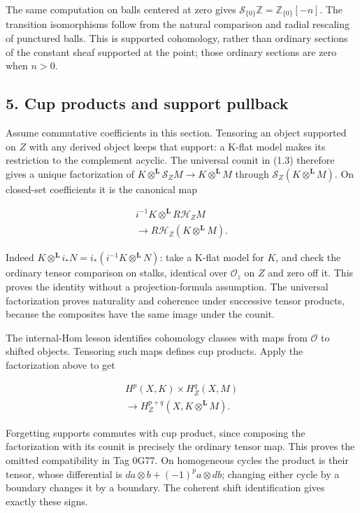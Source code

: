 \documentclass[
  english,
  11pt,
  a4paper,
]{article}
\begin{document}
The same computation on balls centered at zero gives
\(\mathcal S_{\{0\}}\mathbb Z=\mathbb Z_{\{0\}}[-n]\). The transition
isomorphisms follow from the natural comparison and radial rescaling of
punctured balls. This is supported cohomology, rather than ordinary
sections of the constant sheaf supported at the point; those ordinary
sections are zero when \(n>0\).

\subsection{5. Cup products and support
pullback}\label{sections-with-support-and-the-localization-triangle--5-cup-products-and-support-pullback}

Assume commutative coefficients in this section. Tensoring an object
supported on \(Z\) with any derived object keeps that support: a K-flat
model makes its restriction to the complement acyclic. The universal
counit in (1.3) therefore gives a unique factorization of
\(K\otimes^{\mathbf L}\mathcal S_ZM\to K\otimes^{\mathbf L}M\) through
\(\mathcal S_Z(K\otimes^{\mathbf L}M)\). On closed-set coefficients it
is the canonical map

\[\begin{gathered}
i^{-1}K\otimes^{\mathbf L}R\mathcal H_ZM\\
\longrightarrow R\mathcal H_Z(K\otimes^{\mathbf L}M).
\end{gathered}
\tag{5.1}\]

Indeed \(K\otimes^{\mathbf L}i_*N=i_*(i^{-1}K\otimes^{\mathbf L}N)\):
take a K-flat model for \(K\), and check the ordinary tensor comparison
on stalks, identical over \(\mathcal O_z\) on \(Z\) and zero off it.
This proves the identity without a projection-formula assumption. The
universal factorization proves naturality and coherence under successive
tensor products, because the composites have the same image under the
counit.

The internal-Hom lesson identifies cohomology classes with maps from
\(\mathcal O\) to shifted objects. Tensoring such maps defines cup
products. Apply the factorization above to get

\[\begin{gathered}
H^p(X,K)\times H_Z^q(X,M)\\
\longrightarrow H_Z^{p+q}(X,K\otimes^{\mathbf L}M).
\end{gathered}
\tag{5.2}\]

Forgetting supports commutes with cup product, since composing the
factorization with its counit is precisely the ordinary tensor map. This
proves the omitted compatibility in Tag 0G77. On homogeneous cycles the
product is their tensor, whose differential is
\(da\otimes b+(-1)^pa\otimes db\); changing either cycle by a boundary
changes it by a boundary. The coherent shift identification gives
exactly these signs.
\end{document}
